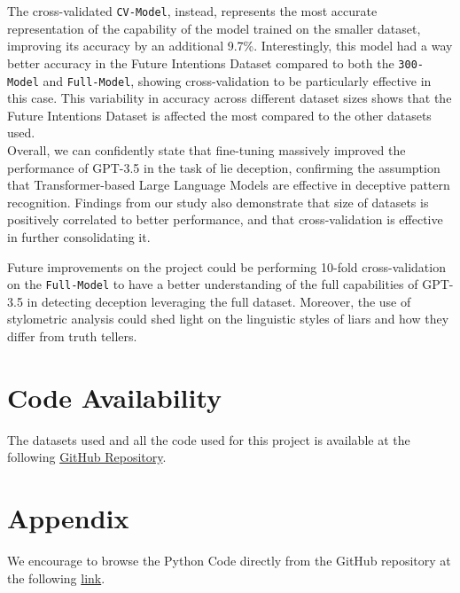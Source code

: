 \documentclass[10pt,twocolumn,letterpaper]{article}
\begin{document}
The cross-validated \texttt{CV-Model}, instead, represents the most accurate representation of the capability of the model trained
on the smaller dataset, improving its accuracy by an additional 9.7\%. Interestingly, this model had a way better accuracy
in the Future Intentions Dataset compared to both the \texttt{300-Model} and \texttt{Full-Model}, showing cross-validation to be particularly
effective in this case. This variability in accuracy across different dataset sizes shows that the Future Intentions Dataset is affected the 
most compared to the other datasets used. \\

Overall, we can confidently state that fine-tuning massively improved the performance of GPT-3.5 in the task of lie deception,
confirming the assumption that Transformer-based Large Language Models are effective in deceptive pattern recognition. Findings
from our study also demonstrate that size of datasets is positively correlated to better performance, and that cross-validation
is effective in further consolidating it.

Future improvements on the project could be performing 10-fold cross-validation on the \texttt{Full-Model} to have a better understanding
of the full capabilities of GPT-3.5 in detecting deception leveraging the full dataset. Moreover, the use of stylometric analysis could shed
light on the linguistic styles of liars and how they differ from truth tellers.

\section{Code Availability}
The datasets used and all the code used for this project is available
at the following \href{https://github.com/TannerAGraves/GPT-LieDetection/}{GitHub Repository}.



{\small


}

\clearpage %
\onecolumn %

\section{Appendix}
\label{sec:appendix}

We encourage to browse the Python Code directly from the GitHub repository at the following \href{https://github.com/TannerAGraves/GPT-LieDetection/}{link}.
\end{document}
